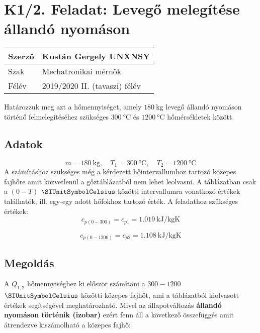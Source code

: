 \section*{K1/2. Feladat: Levegő melegítése állandó nyomáson}
\begin{tabular}{ | p{2cm} | p{14cm} | } 
	\hline
	Szerző & Kustán Gergely UNXNSY \\ 
	\hline
	Szak & Mechatronikai mérnök  \\ 
	\hline
	Félév & 2019/2020 II. (tavaszi) félév \\ 
	\hline
\end{tabular}
\vspace{0.5cm}

\noindent
Határozzuk meg azt a hőmennyiséget, amely $\SI{180}{\kilogram}$ levegő állandó nyomáson történő felmelegítéséhez szükséges $\SI{300}{\celsius}$ és $\SI{1200}{\celsius}$ hőmérsékletek között.
\subsection*{Adatok}
\begin{equation*}
	m = \SI{180}{\kilogram},
	\quad
	T_1 = \SI{300}{\celsius},
	\quad
	T_2 = \SI{1200}{\celsius} 
\end{equation*}
\noindent A számításhoz szükséges még a kérdezett hőintervallumhoz tartozó közepes fajhőre amit közvetlenül a gőztáblázatból nem lehet leolvasni. A táblázatban csak a $(0-T)$ $\SIUnitSymbolCelsius$ közötti intervallumra vonatkozó értékek találhatók, ill. egy-egy adott hőfokhoz tartozó érték.
A feladathoz szükséges értékek:
\begin{equation*}
	c_{p(0-300)} = c_{p1} = \SI{1,019}{\kilo\joule\per\kilogram\kelvin} 
\end{equation*}

\begin{equation*}
	c_{p(0-1200)} = c_{p2} = \SI{1,108}{\kilo\joule\per\kilogram\kelvin} 
\end{equation*}

\subsection*{Megoldás}
A $Q_{1,2}$ hőmennyiséghez ki először számítani a $300-1200$ $\SIUnitSymbolCelsius$ közötti közepes fajhőt, ami a táblázatból kiolvasott értékek segítségével meghatározható. Mivel az állapotváltozás \textbf{állandó nyomáson történik (izobar)}  ezért fenn áll a következő összefüggés amit átrendezve kiszámolható a közepes fajhő:

